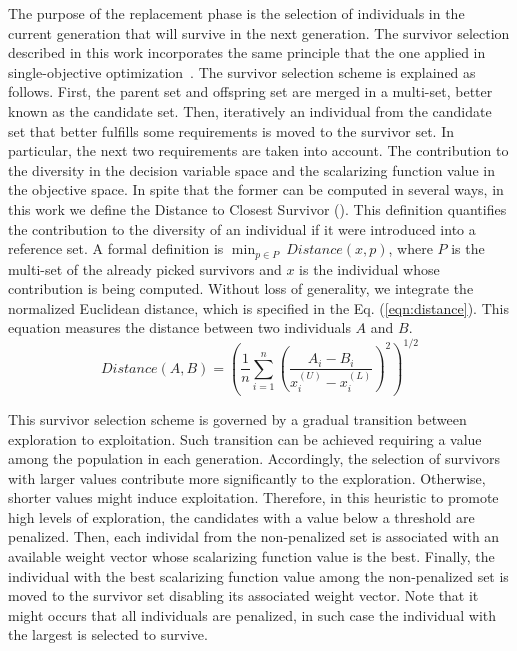 The purpose of the replacement phase is the selection of individuals in the current generation that will survive in the next generation.
%
The survivor selection described in this work incorporates the same principle that the one applied in single-objective optimization~\cite{castillo2019differential}.
%
The survivor selection scheme is explained as follows.
%
First, the parent set and offspring set are merged in a multi-set, better known as the candidate set.
%
Then, iteratively an individual from the candidate set that better fulfills some requirements is moved to the survivor set.
%
In particular, the next two requirements are taken into account.
%
The contribution to the diversity in the decision variable space and the scalarizing function value in the objective space.
%
In spite that the former can be computed in several ways, in this work we define the Distance to Closest Survivor (\DCS{}).
%
This definition quantifies the contribution to the diversity of an individual if it were introduced into a reference set.
%
A formal definition is $\displaystyle{\min_{p \in P}\ Distance(x, p)}$, where $P$ is the multi-set of the already picked survivors and $x$ is the individual whose contribution is being computed.
%
Without loss of generality, we integrate the normalized Euclidean distance, which is specified in the Eq. (\ref{eqn:distance}).
%
This equation measures the distance between two individuals $A$ and $B$.
%
\begin{equation}\label{eqn:distance}
Distance(A, B) =   \left ( \frac{1}{n}  \sum_{i=1}^n \left ( \frac{A_i - B_i}{x_i^{(U)} - x_i^{(L)}} \right )^2  \right)^{1/2}
\end{equation}

This survivor selection scheme is governed by a gradual transition between exploration to exploitation.
%
Such transition can be achieved requiring a \DCS{} value among the population in each generation.
%
Accordingly, the selection of survivors with larger \DCS{} values contribute more significantly to the exploration.
%
Otherwise, shorter \DCS{} values might induce exploitation.
%
Therefore, in this heuristic to promote high levels of exploration, the candidates with a \DCS{} value below a threshold are penalized.
%
Then, each individal from the non-penalized set is associated with an available weight vector whose scalarizing function value is the best.
%
Finally, the individual with the best scalarizing function value among the non-penalized set is moved to the survivor set disabling its associated weight vector.
%
Note that it might occurs that all individuals are penalized, in such case the individual with the largest \DCS{} is selected to survive.

